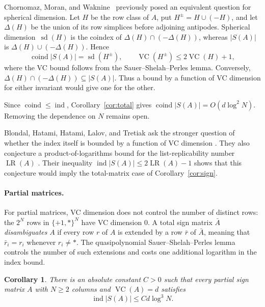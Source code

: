 \documentclass[11pt]{article}
\newtheorem{corollary}[theorem]{Corollary}
\theoremstyle{remark}
\begin{document}
Chornomaz, Moran, and Waknine~\cite{chornomaz2025spherical} previously posed an equivalent
question for spherical dimension.
Let $H$ be the row class of $A$, put $H^{\pm}=H\cup(-H)$,
and let $\Delta(H)$ be the union of its row simplices before
adjoining antipodes. Spherical dimension~$\operatorname{sd}(H)$ is the coindex of
$\Delta(H)\cap(-\Delta(H))$, whereas $|S(A)|$ is
$\Delta(H)\cup(-\Delta(H))$. Hence
\[
 \operatorname{coind}|S(A)|=\operatorname{sd}(H^{\pm}),
 \qquad
 \operatorname{VC}(H^{\pm})\leq2\operatorname{VC}(H)+1,
\]
where the VC bound follows from the Sauer--Shelah--Perles lemma.
Conversely, $\Delta(H)\cap(-\Delta(H))\subseteq|S(A)|$.
Thus a bound by a function of VC dimension for either invariant
would give one for the other.

Since $\operatorname{coind}\leq\operatorname{ind}$,
Corollary~\ref{cor:total} gives
$\operatorname{coind}|S(A)|=O(d\log^2 N)$.
Removing the dependence on $N$ remains open.


Blondal, Hatami, Hatami, Lalov, and Tretiak ask the stronger
question of whether the index itself is bounded by a function of
VC dimension \cite[Problem~1.18]{BHHHT}.
They also conjecture a product-of-logarithms bound for the
list-replicability number $\operatorname{LR}(A)$
\cite[Conjecture~1.17]{BHHHT}. Their inequality
$\operatorname{ind}|S(A)|\leq2\operatorname{LR}(A)-1$
\cite[Theorem~1.1]{BHHHT} shows that this conjecture would imply
the total-matrix case of Corollary~\ref{cor:sign}.

\paragraph{Partial matrices.}
For partial matrices, VC dimension does not control the number of
distinct rows: the $2^N$ rows in $\{+1,*\}^{N}$ have VC dimension
$0$.
A total sign matrix $\bar A$ \emph{disambiguates} $A$ if every row
$r$ of $A$ is extended by a row $\bar r$ of $\bar A$, meaning that
$\bar r_i=r_i$ whenever $r_i\ne *$.
The quasipolynomial Sauer--Shelah--Perles lemma controls the number
of such extensions and costs one additional logarithm in the
index bound.

\begin{corollary}\label{cor:partial}
There is an absolute constant $C>0$ such that every partial sign
matrix $A$ with $N\geq2$ columns and $\operatorname{VC}(A)=d$ satisfies
\[
 \operatorname{ind}|S(A)|\leq C d\log^3 N.
\]
\end{corollary}
\end{document}

